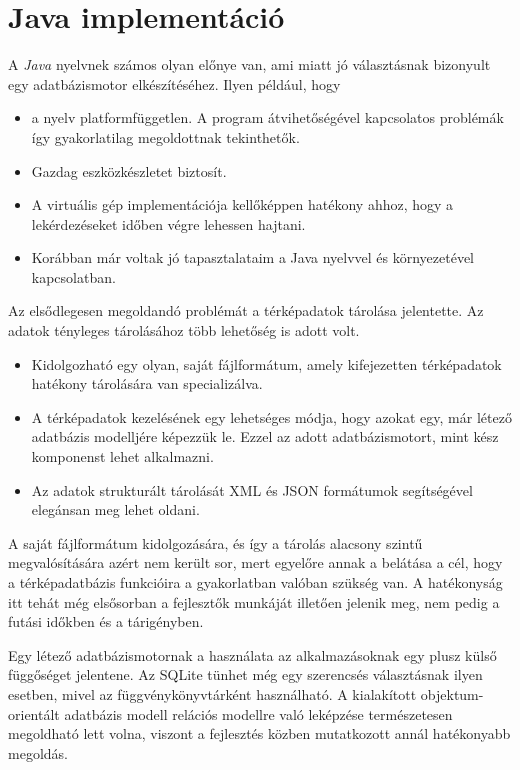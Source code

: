 
\section{Java implementáció}

A \textit{Java} nyelvnek számos olyan előnye van, ami miatt jó választásnak bizonyult egy adatbázismotor elkészítéséhez. Ilyen például, hogy
\begin{itemize}
\item a nyelv platformfüggetlen. A program átvihetőségével kapcsolatos problémák így gyakorlatilag megoldottnak tekinthetők.
\item Gazdag eszközkészletet biztosít.
\item A virtuális gép implementációja kellőképpen hatékony ahhoz, hogy a lekérdezéseket időben végre lehessen hajtani.
\item Korábban már voltak jó tapasztalataim a Java nyelvvel és környezetével kapcsolatban.
\end{itemize}

Az elsődlegesen megoldandó problémát a térképadatok tárolása jelentette. Az adatok tényleges tárolásához több lehetőség is adott volt.
\begin{itemize}
\item Kidolgozható egy olyan, saját fájlformátum, amely kifejezetten térképadatok hatékony tárolására van specializálva.
\item A térképadatok kezelésének egy lehetséges módja, hogy azokat egy, már létező adatbázis modelljére képezzük le. Ezzel az adott adatbázismotort, mint kész komponenst lehet alkalmazni.
\item Az adatok strukturált tárolását XML és JSON formátumok segítségével elegánsan meg lehet oldani.
\end{itemize}

A saját fájlformátum kidolgozására, és így a tárolás alacsony szintű megvalósítására azért nem került sor, mert egyelőre annak a belátása a cél, hogy a térképadatbázis funkcióira a gyakorlatban valóban szükség van. A hatékonyság itt tehát még elsősorban a fejlesztők munkáját illetően jelenik meg, nem pedig a futási időkben és a tárigényben.

Egy létező adatbázismotornak a használata az alkalmazásoknak egy plusz külső függőséget jelentene. Az SQLite tünhet még egy szerencsés választásnak ilyen esetben, mivel az függvénykönyvtárként használható. A kialakított objektum-orientált adatbázis modell relációs modellre való leképzése természetesen megoldható lett volna, viszont a fejlesztés közben mutatkozott annál hatékonyabb megoldás.

